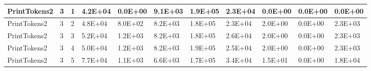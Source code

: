\begin{table*}[]
\begin{tabular}{@{}lllllllllll@{}}
        PrintTokens2                                             & 3                                                       & 1    & 4.2E+04                                                     & 0.0E+00                                                               & 9.1E+03                                                 & 1.9E+05                                                    & 2.3E+04                                                        & 0.0E+00                                                & 0.0E+00                                                   & 0.0E+00 \\ \midrule
        PrintTokens2                                             & 3                                                       & 2    & 4.8E+04                                                     & 8.0E+02                                                               & 8.2E+03                                                 & 1.8E+05                                                    & 2.3E+04                                                        & 2.0E+00                                                & 0.0E+00                                                   & 2.3E+03 \\ \midrule
        PrintTokens2                                             & 3                                                       & 3    & 5.2E+04                                                     & 1.2E+03                                                               & 8.2E+03                                                 & 1.8E+05                                                    & 2.6E+04                                                        & 2.0E+00                                                & 0.0E+00                                                   & 2.3E+03 \\ \midrule
        PrintTokens2                                             & 3                                                       & 4    & 5.0E+04                                                     & 1.2E+03                                                               & 8.2E+03                                                 & 1.9E+05                                                    & 2.5E+04                                                        & 2.0E+00                                                & 0.0E+00                                                   & 2.3E+03 \\ \midrule
        PrintTokens2                                             & 3                                                       & 5    & 7.7E+04                                                     & 1.1E+03                                                               & 6.6E+03                                                 & 1.7E+05                                                    & 3.4E+04                                                        & 1.5E+01                                                & 0.0E+00                                                   & 1.8E+04 \\ \midrule \midrule

\end{tabular}
\end{table*}
